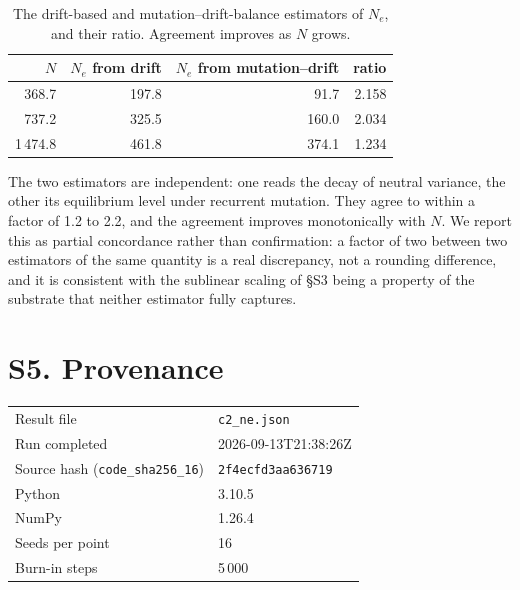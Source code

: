 \documentclass[11pt]{article}
\begin{document}
\begin{table}[ht]
\centering\small
\caption{The drift-based and mutation--drift-balance estimators of
$N_e$, and their ratio. Agreement improves as $N$ grows.}
\label{tab:s_estimadores}
\begin{tabular}{rrrr}
\toprule
$N$ & $N_e$ from drift & $N_e$ from mutation--drift & ratio\\
\midrule
368.7 & 197.8 & 91.7 & 2.158\\
737.2 & 325.5 & 160.0 & 2.034\\
1\,474.8 & 461.8 & 374.1 & 1.234\\
\bottomrule
\end{tabular}
\end{table}

The two estimators are independent: one reads the decay of neutral
variance, the other its equilibrium level under recurrent mutation.
They agree to within a factor of 1.2 to 2.2,
and the agreement improves monotonically with $N$. We report this as
partial concordance rather than confirmation: a factor of two between
two estimators of the same quantity is a real discrepancy, not a
rounding difference, and it is consistent with the sublinear scaling
of \S S3 being a property of the substrate that neither estimator
fully captures.

\section*{S5. Provenance}

\begin{tabular}{ll}
\toprule
Result file & \texttt{c2\_ne.json}\\
Run completed & 2026-09-13T21:38:26Z\\
Source hash (\texttt{code\_sha256\_16}) & \texttt{2f4ecfd3aa636719}\\
Python & 3.10.5\\
NumPy & 1.26.4\\
Seeds per point & 16\\
Burn-in steps & 5\,000\\
\bottomrule
\end{tabular}



\end{document}
